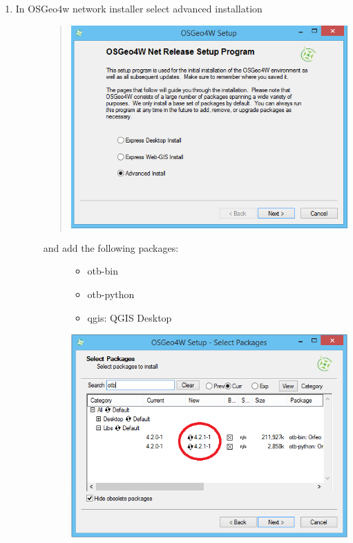 \documentclass[letterpaper,10pt,english]{sphinxmanual}
\begin{document}
\begin{description}
\begin{enumerate}
\item {} \begin{description}
\item[{In OSGeo4w network installer select advanced installation}] \leavevmode\begin{quote}

\includegraphics{advanced.png}
\end{quote}
\begin{description}
\item[{and add the following packages:}] \leavevmode\begin{itemize}
\item {} 
otb-bin

\item {} 
otb-python

\item {} 
qgis: QGIS Desktop

\end{itemize}

\includegraphics{select_packages.png}


\end{description}
\end{description}
\end{enumerate}
\end{description}
\end{document}
